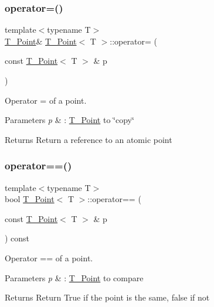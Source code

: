 \subsubsection{\texorpdfstring{operator=()}{operator=()}}
{\footnotesize\ttfamily template$<$typename T$>$ \\
\hyperlink{classT__Point}{T\+\_\+\+Point}\& \hyperlink{classT__Point}{T\+\_\+\+Point}$<$ T $>$\+::operator= (\begin{DoxyParamCaption}\item[{const \hyperlink{classT__Point}{T\+\_\+\+Point}$<$ T $>$ \&}]{p }\end{DoxyParamCaption})\hspace{0.3cm}{\ttfamily [inline]}}



Operator = of a point. 


\begin{DoxyParams}{Parameters}
{\em p} & \+: \hyperlink{classT__Point}{T\+\_\+\+Point} to \char`\"{}copy\char`\"{} \\
\hline
\end{DoxyParams}
\begin{DoxyReturn}{Returns}
Return a reference to an atomic point 
\end{DoxyReturn}
\mbox{\label{classT__Point_a83c15f53049523cc75c23350ceb4832a}} 
\subsubsection{\texorpdfstring{operator==()}{operator==()}}
{\footnotesize\ttfamily template$<$typename T$>$ \\
bool \hyperlink{classT__Point}{T\+\_\+\+Point}$<$ T $>$\+::operator== (\begin{DoxyParamCaption}\item[{const \hyperlink{classT__Point}{T\+\_\+\+Point}$<$ T $>$ \&}]{p }\end{DoxyParamCaption}) const\hspace{0.3cm}{\ttfamily [inline]}}



Operator == of a point. 


\begin{DoxyParams}{Parameters}
{\em p} & \+: \hyperlink{classT__Point}{T\+\_\+\+Point} to compare \\
\hline
\end{DoxyParams}
\begin{DoxyReturn}{Returns}
Return True if the point is the same, false if not 
\end{DoxyReturn}
\mbox{\label{classT__Point_a0a9956de8ab7c8dccf35b78c43aedefd}} 
